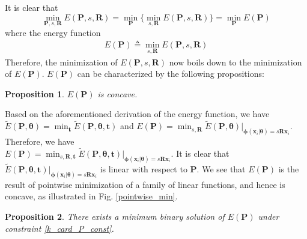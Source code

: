 \documentclass[11pt,bezier,]{article}
\newtheorem{proposition}{Proposition}
\begin{document}
It is clear that
\[
 \min_{\mathbf P,s,\mathbf R} E(\mathbf P,s,\mathbf R)=
 \min_{\mathbf P} \{\min_{s,\mathbf R} E(\mathbf P,s,\mathbf R)\} =\min_{\mathbf P} E(\mathbf P)
\]
where the energy function
\begin{gather}
 E(\mathbf P)\triangleq\min_{s,\mathbf R}  E(\mathbf P,s,\mathbf R) 
\label{E_P}
\end{gather}
Therefore,
the minimization of $E(\mathbf P,s,\mathbf R)$ now
boils down to the minimization of $E(\mathbf P)$.
$E(\mathbf P)$ can be characterized by the  following propositions:
\begin{proposition} \label{prop_3}
$E(\mathbf P)$ is concave. %
\end{proposition}
{\proof
Based on the aforementioned derivation of the energy function,
we have $\widetilde E(\mathbf P,\boldsymbol\theta )=\min_{{\mathbf t}} \widetilde E(\mathbf P,\boldsymbol\theta,\mathbf t)$ and
$E(\mathbf P) =\min_{s,\mathbf R} \widetilde E(\mathbf P,\boldsymbol\theta)|_{\boldsymbol\phi(\mathbf x_i|\boldsymbol\theta)=s\mathbf R\mathbf x_i}$.
Therefore, we have  \\
$E(\mathbf P)=\min_{s,\mathbf R,{\mathbf t}} \widetilde E(\mathbf P,\boldsymbol\theta,{\mathbf t})|_{\boldsymbol\phi(\mathbf x_i|\boldsymbol\theta)=s\mathbf R\mathbf x_i}$.
It is clear that
$\widetilde E(\mathbf P,\boldsymbol\theta,{\mathbf t})|_{\boldsymbol\phi(\mathbf x_i|\boldsymbol\theta)=s\mathbf R\mathbf x_i}$ is  linear with respect to $\mathbf P$.
We see that $E(\mathbf P)$ is the result of pointwise minimization of a family of linear functions,
and hence is concave, as illustrated in Fig. \ref{pointwise_min}.
}

\begin{proposition} \label{prop_4}
There exists a minimum binary solution of
$E(\mathbf P)$  under  constraint \eqref{k_card_P_const}.
\end{proposition}
\end{document}
